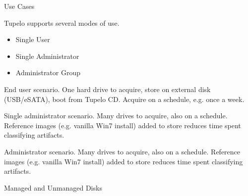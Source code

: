 \documentclass{beamer}
\begin{document}

\begin{frame}{Use Cases}

Tupelo supports several modes of use.


\begin{itemize}
\item 
Single User

\item
Single Administrator

\item
Administrator Group

\end{itemize}

\end{frame}



\begin{frame}
End user scenario.  One hard drive to acquire, store on
  external disk (USB/eSATA), boot from Tupelo CD.  Acquire on a
  schedule, e.g. once a week.  
\end{frame}


\begin{frame}
Single administrator scenario.  Many drives to acquire, also on a
  schedule.  Reference images (e.g. vanilla Win7 install) added to
  store reduces time spent classifying artifacts.
\end{frame}


\begin{frame}
Administrator scenario.  Many drives to acquire, also on a
  schedule.  Reference images (e.g. vanilla Win7 install) added to
  store reduces time spent classifying artifacts.
\end{frame}


\begin{frame}{Managed and Unmanaged Disks}

\end{frame}

\end{document}
